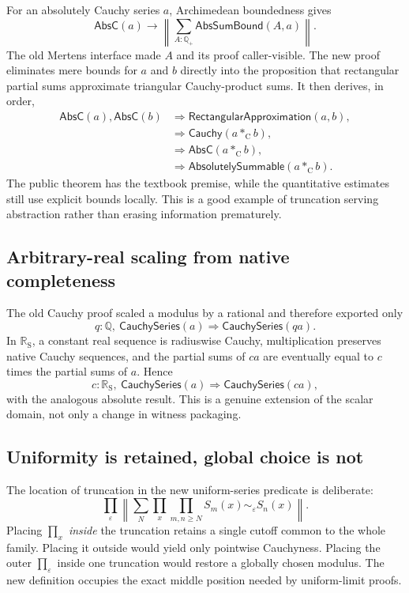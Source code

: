 \documentclass[11pt,a4paper]{article}
\newcommand{\Q}{\mathbb{Q}}
\newcommand{\Qp}{\mathbb{Q}_{+}}
\newcommand{\RS}{\mathbb{R}_{\mathrm S}}
\newcommand{\brck}[1]{\left\lVert #1\right\rVert}
\newcommand{\prd}[2]{\prod_{#1} #2}
\newcommand{\sm}[2]{\sum_{#1} #2}
\newcommand{\close}[1]{\mathrel{\sim_{#1}}}
\newcommand{\AbsC}{\mathsf{AbsC}}
\newcommand{\CP}{\mathbin{*_{\mathrm C}}}
\begin{document}
For an absolutely Cauchy series $a$, Archimedean boundedness gives
\[
  \AbsC(a)\longrightarrow
  \brck{\sm{A:\Qp}\mathsf{AbsSumBound}(A,a)}.
\]
The old Mertens interface made $A$ and its proof caller-visible.  The new proof eliminates
mere bounds for $a$ and $b$ directly into the proposition that rectangular partial sums
approximate triangular Cauchy-product sums.  It then derives, in order,
\begin{align*}
  \AbsC(a),\AbsC(b)
    &\Longrightarrow \mathsf{RectangularApproximation}(a,b),\\
    &\Longrightarrow \mathsf{Cauchy}(a\CP b),\\
    &\Longrightarrow \AbsC(a\CP b),\\
    &\Longrightarrow \mathsf{AbsolutelySummable}(a\CP b).
\end{align*}
The public theorem has the textbook premise, while the quantitative estimates still use
explicit bounds locally.  This is a good example of truncation serving abstraction rather
than erasing information prematurely.

\subsection{Arbitrary-real scaling from native completeness}

The old Cauchy proof scaled a modulus by a rational and therefore exported only
\[
  q:\Q,\ \mathsf{CauchySeries}(a)
  \Longrightarrow \mathsf{CauchySeries}(q a).
\]
In $\RS$, a constant real sequence is radiuswise Cauchy, multiplication preserves native
Cauchy sequences, and the partial sums of $ca$ are eventually equal to
$c$ times the partial sums of $a$.  Hence
\[
  c:\RS,\ \mathsf{CauchySeries}(a)
  \Longrightarrow \mathsf{CauchySeries}(ca),
\]
with the analogous absolute result.  This is a genuine extension of the scalar domain, not
only a change in witness packaging.

\subsection{Uniformity is retained, global choice is not}

The location of truncation in the new uniform-series predicate is deliberate:
\[
  \prd{\varepsilon}\brck{\sm{N}
  \prd{x}\prd{m,n\ge N}S_m(x)\close{\varepsilon}S_n(x)}.
\]
Placing $\prod_x$ \emph{inside} the truncation retains a single cutoff common to the whole
family.  Placing it outside would yield only pointwise Cauchyness.  Placing the outer
$\prod_\varepsilon$ inside one truncation would restore a globally chosen modulus.  The new
definition occupies the exact middle position needed by uniform-limit proofs.
\end{document}
